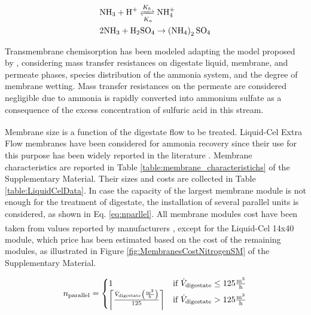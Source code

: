\begin{refsection}[referencesCh6]
\begin{align}
	& \text{NH}_3 + \text{H}^+ \xrightleftharpoons[K_a]{K_b} \text{NH}_4^+\label{eq:NH3NH4}
	\\
	& 2\text{NH}_3 + \text{H}_2\text{SO}_4 \rightarrow \left(\text{NH}_4\right)_{2}\text{SO}_4  \label{eq:AmmoniumSulfate}  %
\end{align}


Transmembrane chemisorption has been modeled adapting the model proposed by \citet{rongwong2020}, considering mass transfer resistances on digestate liquid, membrane, and permeate phases, species distribution of the ammonia system, and the degree of membrane wetting. Mass transfer resistances on the permeate are considered negligible due to ammonia is rapidly converted into ammonium sulfate as a consequence of the excess concentration of sulfuric acid in this stream.

Membrane size is a function of the digestate flow to be treated. Liquid-Cel\textsuperscript{\texttrademark} Extra Flow membranes \citep{LiquidCelData} have been considered for ammonia recovery since their use for this purpose has been widely reported in the literature \citep{darestani2017hollow, rongwong2020, linstrom2001}. Membrane characteristics are reported in
Table \ref{table:membrane_characteristichs} of the Supplementary Material.
Their sizes and costs
are collected in Table \ref{table:LiquidCelData}.
In case the capacity of the largest membrane module is not enough for the treatment of digestate, the installation of several parallel units is considered, as shown in Eq. \ref{eq:nparllel}. All membrane modules cost have been taken from values reported by manufacturers \citep{SGProjects, DPCWaterSolutions}, except for the Liquid-Cel\textsuperscript{\texttrademark} 14x40 module, which price has been estimated based on the cost of the remaining modules, as illustrated in
Figure \ref{fig:MembranesCostNitrogenSM} of the Supplementary Material.

\begin{align}
n_{\text{parallel}} =
\begin{cases}
1 & \text{if } \dot{V}_{\text{digestate}} \leq 125 \frac{\text{m}^3}{\text{h}}  \\
\ceil*{\frac{\dot{V}_{\text{digestate}} \left(\frac{\text{m}^3}{h}\right)}{125}} & \text{if } \dot{V}_{\text{digestate}} > 125 \frac{\text{m}^3}{\text{h}}
\end{cases} \label{eq:nparllel}
\end{align}


\end{refsection}
